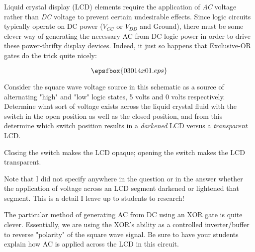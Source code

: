 

Liquid crystal display (LCD) elements require the application of {\it AC} voltage rather than {\it DC} voltage to prevent certain undesirable effects.  Since logic circuits typically operate on DC power ($V_{CC}$ or $V_{DD}$ and Ground), there must be some clever way of generating the necessary AC from DC logic power in order to drive these power-thrifty display devices.  Indeed, it just so happens that Exclusive-OR gates do the trick quite nicely:

$$\epsfbox{03014x01.eps}$$

Consider the square wave voltage source in this schematic as a source of alternating "high" and "low" logic states, 5 volts and 0 volts respectively.  Determine what sort of voltage exists across the liquid crystal fluid with the switch in the open position as well as the closed position, and from this determine which switch position results in a {\it darkened} LCD versus a {\it transparent} LCD.







Closing the switch makes the LCD opaque; opening the switch makes the LCD transparent.







Note that I did not specify anywhere in the question or in the answer whether the application of voltage across an LCD segment darkened or lightened that segment.  This is a detail I leave up to students to research!

The particular method of generating AC from DC using an XOR gate is quite clever.  Essentially, we are using the XOR's ability as a controlled inverter/buffer to reverse "polarity" of the square wave signal.  Be sure to have your students explain how AC is applied across the LCD in this circuit.




